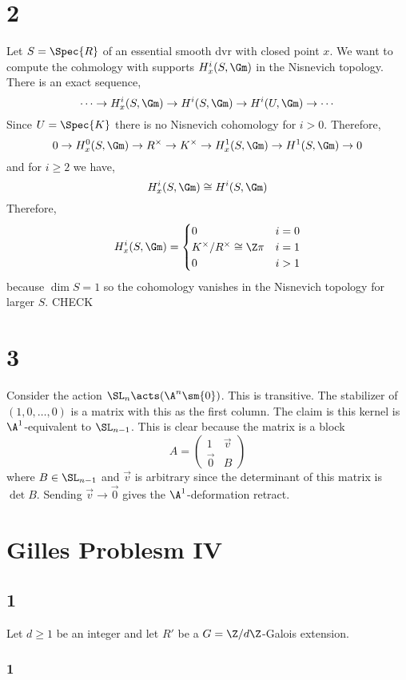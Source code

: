 \documentclass{article}
\begin{document}
\section{2}

Let $S = \Spec{R}$ of an essential smooth dvr with closed point $x$. We want to compute the cohmology with supports $H^i_x(S, \Gm)$ in the Nisnevich topology. There is an exact sequence,
\[ \cdots \to H^i_x(S, \Gm) \to H^i(S, \Gm) \to H^i(U, \Gm) \to \cdots \]
Since $U = \Spec{K}$ there is no Nisnevich cohomology for $i > 0$. Therefore,
\[ 0 \to H^0_x(S, \Gm) \to R^\times \to K^\times \to H^1_x(S, \Gm) \to H^1(S, \Gm) \to 0 \]
and for $i \ge 2$ we have,
\[ H^i_x(S, \Gm) \cong H^i(S, \Gm) \]
Therefore,
\[ H^i_x(S, \Gm) = 
\begin{cases}
0 & i = 0
\\
K^\times / R^\times \cong \Z \pi & i = 1
\\
0 & i > 1
\end{cases} \]
because $\dim{S} = 1$ so the cohomology vanishes in the Nisnevich topology for larger $S$. {\color{red} CHECK}

\section{3}

Consider the action $\SL_n \acts (\A^n \sm \{ 0 \})$. This is transitive. The stabilizer of $(1,0,\dots, 0)$ is a matrix with this as the first column. The claim is this kernel is $\A^1$-equivalent to $\SL_{n-1}$. This is clear because the matrix is a block
\[ A = \begin{pmatrix}
1 & \vec{v}
\\
\vec{0} & B
\end{pmatrix} \]
where $B \in \SL_{n-1}$ and $\vec{v}$ is arbitrary since the determinant of this matrix is $\det{B}$. Sending $\vec{v} \to \vec{0}$ gives the $\A^1$-deformation retract.  

\section{Gilles Problesm IV}

\subsection{1}

Let $d \ge 1$ be an integer and let $R'$ be a $G = \Z/d\Z$-Galois extension. 

\subsubsection{1}
\end{document}
